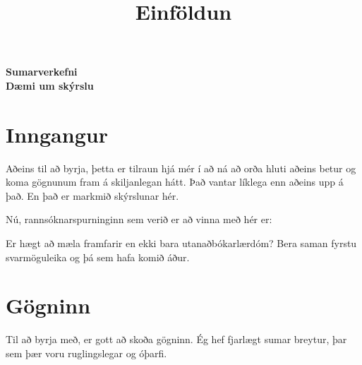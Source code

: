 \documentclass[
]{article}
\title{Einföldun}
\author{}
\date{\vspace{-2.5em}}
\newenvironment{Shaded}{\begin{snugshade}}{\end{snugshade}}
\newcommand{\DataTypeTok}[1]{\textcolor[rgb]{0.13,0.29,0.53}{#1}}
\newcommand{\KeywordTok}[1]{\textcolor[rgb]{0.13,0.29,0.53}{\textbf{#1}}}
\newcommand{\NormalTok}[1]{#1}
\newcommand{\OperatorTok}[1]{\textcolor[rgb]{0.81,0.36,0.00}{\textbf{#1}}}
\newcommand{\StringTok}[1]{\textcolor[rgb]{0.31,0.60,0.02}{#1}}
\begin{document}
\maketitle

\begin{center}
\LARGE{\textbf{Sumarverkefni}}\\
\vspace*{2\baselineskip}
\Large{\textbf{Dæmi um skýrslu}}
\end{center}
\thispagestyle{empty}
\newpage

\hypertarget{inngangur}{%
\section{Inngangur}\label{inngangur}}

Aðeins til að byrja, þetta er tilraun hjá mér í að ná að orða hluti aðeins betur og koma gögnunum fram á skiljanlegan hátt. Það vantar líklega enn aðeins upp á það. En það er markmið skýrslunar hér.

Nú, rannsóknarspurninginn sem verið er að vinna með hér er:

Er hægt að mæla framfarir en ekki bara utanaðbókarlærdóm? Bera saman fyrstu svarmöguleika og þá sem hafa komið áður.

\hypertarget{guxf6gninn}{%
\section{Gögninn}\label{guxf6gninn}}

Til að byrja með, er gott að skoða gögninn. Ég hef fjarlægt sumar breytur, þar sem þær voru ruglingslegar og óþarfi.

\begin{Shaded}
\end{Shaded}
\end{document}
